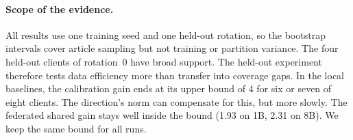 \documentclass[11pt]{article}
\begin{document}
\paragraph{Scope of the evidence.}
All results use one training seed and one held-out rotation, so the bootstrap intervals cover article sampling but not training or partition variance.
The four held-out clients of rotation~0 have broad support.
The held-out experiment therefore tests data efficiency more than transfer into coverage gaps.
In the local baselines, the calibration gain ends at its upper bound of 4 for six or seven of eight clients.
The direction's norm can compensate for this, but more slowly.
The federated shared gain stays well inside the bound (1.93 on 1B, 2.31 on 8B).
We keep the same bound for all runs.


\end{document}
